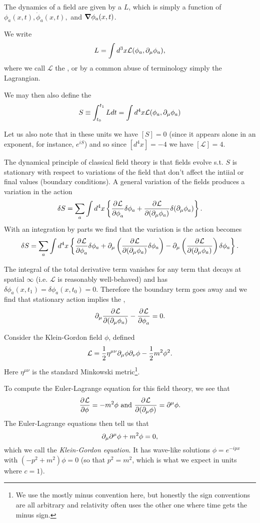 The dynamics of a field are given by a  $L$, which is simply a function of $\phi_a(x,t), \dot \phi_a(x,t),$ and $\mbox{\boldmath$ \nabla $} \phi_a(x,t)$. 
\begin{defn}
We write
$$L=\int d^3 x \mathcal{L}(\phi_a, \partial_\mu \phi_a),$$
where we call $\mathcal{L}$ the , or by a common abuse of terminology simply the Lagrangian.
\end{defn}
\begin{defn}
We may then also define the 
$$S\equiv \int_{t_0}^{t_1}L dt = \int d^4x \mathcal{L}(\phi_a,\partial_\mu \phi_a)$$
\end{defn}
Let us also note that in these units we have $[S]=0$ (since it appears alone in an exponent, for instance, $e^{iS}$) and so since $[d^4x]=-4$ we have $[\mathcal{L}]=4.$

The dynamical principle of classical field theory is that fields evolve s.t. $S$ is stationary with respect to variations of the field that don't affect the intiial or final values (boundary conditions). A general variation of the fields produces a variation in the action
$$\delta S=\sum_a \int d^4 x\left \{ \frac{\partial^{} \mathcal{L}}{\partial \phi_a ^{}}\delta\phi_a +\frac{\partial^{} \mathcal{L}}{\partial (\partial_\mu\phi_a) ^{}} \delta(\partial_\mu \phi_a)\right\}.$$
With an integration by parts we find that the variation is the action becomes
$$\delta S= \sum_a \int d^4x \left\{ \frac{\partial^{} \mathcal{L}}{\partial \phi_a ^{}}\delta \phi_a +\partial_\mu \left( \frac{\partial^{} \mathcal{L}}{\partial (\partial_\mu \phi_a) ^{}}\delta \phi_a\right)-\partial_\mu \left(\frac{\partial^{} \mathcal{L}}{\partial (\partial_\mu \phi_a) ^{}}\right)\delta \phi_a\right\}.$$

The integral of the total derivative term vanishes for any term that decays at spatial $\infty$ (i.e. $\mathcal{L}$ is reasonably well-behaved) and has $\delta \phi_a(x,t_1)=\delta \phi_a(x,t_0)=0$. Therefore the boundary term goes away and we find that stationary action implies the ,
$$\partial_\mu\frac{\partial^{} \mathcal{L}}{\partial (\partial_\mu\phi_a) ^{}}-\frac{\partial^{} \mathcal{L}}{\partial \phi_a ^{}}=0.$$

\begin{exm}
Consider the Klein-Gordon field $\phi$, defined
$$\mathcal{L}=\frac{1}{2} \eta^{\mu\nu}\partial_\mu \phi \partial_\nu \phi -\frac{1}{2}m^2 \phi^2.$$
Here $\eta^{\mu\nu}$ is the standard Minkowski metric\footnote{We use the mostly minus convention here, but honestly the sign conventions are all arbitrary and relativity often uses the other one where time gets the minus sign.}.

To compute the Euler-Lagrange equation for this field theory,
 we see that $$\frac{\partial^{} \mathcal L}{\partial \phi ^{}}=-m^2\phi \text{ and } \frac{\partial^{} \mathcal L}{\partial (\partial_\mu \phi) ^{}}=\partial^\mu \phi.$$
The Euler-Lagrange equations then tell us that $$\partial_\mu \partial^\mu \phi+m^2\phi = 0,$$ which we call the \emph{Klein-Gordon equation}. It has wave-like solutions $\phi=e^{-ipx}$ with $(-p^2+m^2)\phi=0$ (so that $p^2=m^2$, which is what we expect in units where $c=1$).
\end{exm}

